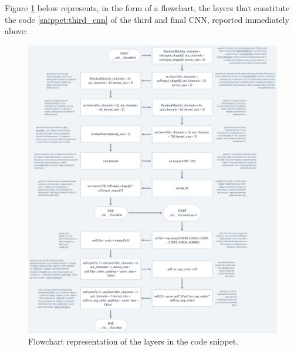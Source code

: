 \documentclass[12pt,italian]{report}
\begin{document}
Figure \ref{fig:third_cnn_layers} below represents, in the form of a flowchart, the layers that constitute the code \ref{snippet:third_cnn} of the third and final CNN, reported immediately above:

\begin{figure}[H]
    \centering
    \includegraphics[width=1\textwidth]{images/third_cnn_layers.png}
    \captionsetup{justification=centering}
    \caption{Flowchart representation of the layers in the code snippet.}
    \label{fig:third_cnn_layers}
\end{figure}
\end{document}
